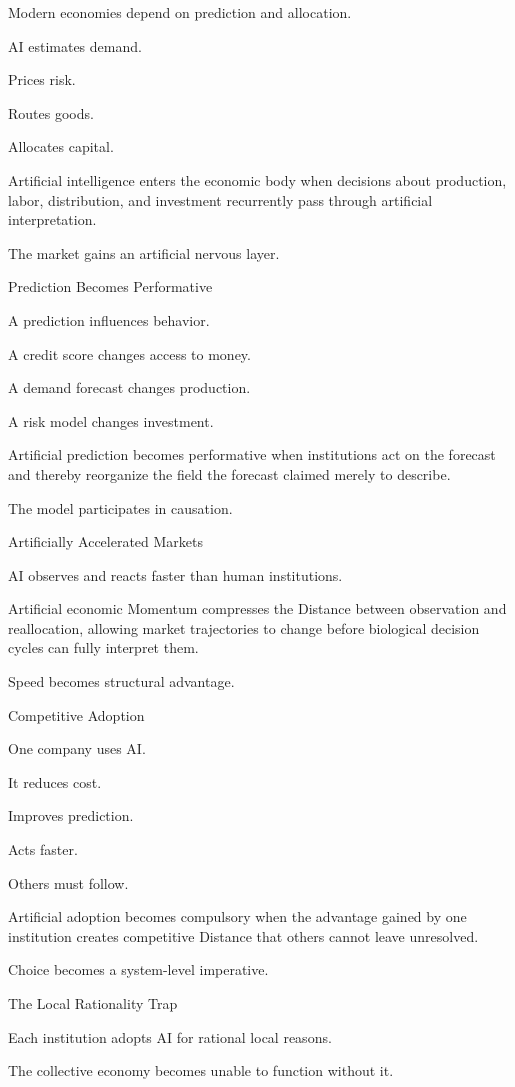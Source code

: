 Modern economies depend on prediction and allocation.

AI estimates demand.

Prices risk.

Routes goods.

Allocates capital.

Artificial intelligence enters the economic body when decisions about production, labor, distribution, and investment recurrently pass through artificial interpretation.

The market gains an artificial nervous layer.

Prediction Becomes Performative

A prediction influences behavior.

A credit score changes access to money.

A demand forecast changes production.

A risk model changes investment.

Artificial prediction becomes performative when institutions act on the forecast and thereby reorganize the field the forecast claimed merely to describe.

The model participates in causation.

Artificially Accelerated Markets

AI observes and reacts faster than human institutions.

Artificial economic Momentum compresses the Distance between observation and reallocation, allowing market trajectories to change before biological decision cycles can fully interpret them.

Speed becomes structural advantage.

Competitive Adoption

One company uses AI.

It reduces cost.

Improves prediction.

Acts faster.

Others must follow.

Artificial adoption becomes compulsory when the advantage gained by one institution creates competitive Distance that others cannot leave unresolved.

Choice becomes a system-level imperative.

The Local Rationality Trap

Each institution adopts AI for rational local reasons.

The collective economy becomes unable to function without it.

